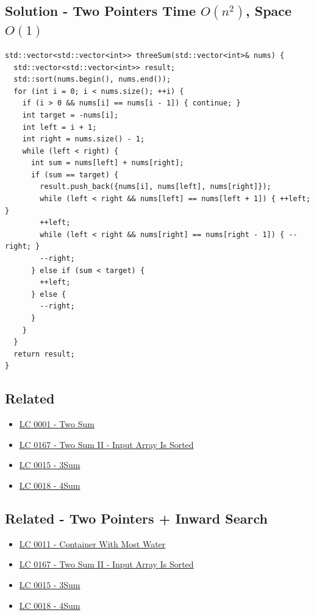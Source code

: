 \subsection*{Solution - Two Pointers {\scriptsize\color{gray}\Coffeecup\hspace{1mm}Time $O(n^2)$, Space $O(1)$}}
\begin{lstlisting}
std::vector<std::vector<int>> threeSum(std::vector<int>& nums) {
  std::vector<std::vector<int>> result;
  std::sort(nums.begin(), nums.end());
  for (int i = 0; i < nums.size(); ++i) {
    if (i > 0 && nums[i] == nums[i - 1]) { continue; }
    int target = -nums[i];
    int left = i + 1;
    int right = nums.size() - 1;
    while (left < right) {
      int sum = nums[left] + nums[right];
      if (sum == target) {
        result.push_back({nums[i], nums[left], nums[right]});
        while (left < right && nums[left] == nums[left + 1]) { ++left; }
        ++left;
        while (left < right && nums[right] == nums[right - 1]) { --right; }
        --right;
      } else if (sum < target) {
        ++left;
      } else {
        --right;
      }
    }
  }
  return result;
}
\end{lstlisting}

\subsection*{Related}
\begin{itemize}
\item \hyperref[lc0001]{LC 0001 - Two Sum}
\item \hyperref[lc0167]{LC 0167 - Two Sum II - Input Array Is Sorted}
\item \hyperref[lc0015]{LC 0015 - 3Sum}
\item \hyperref[lc0018]{LC 0018 - 4Sum}
\end{itemize}

\subsection*{Related - Two Pointers + Inward Search}
\begin{itemize}
\item \hyperref[lc0011]{LC 0011 - Container With Most Water}
\item \hyperref[lc0167]{LC 0167 - Two Sum II - Input Array Is Sorted}
\item \hyperref[lc0015]{LC 0015 - 3Sum}
\item \hyperref[lc0018]{LC 0018 - 4Sum}
\end{itemize}

